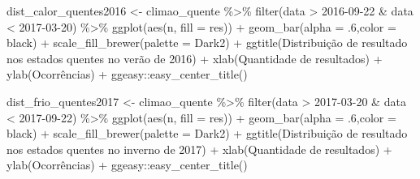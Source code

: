 \documentclass[
]{article}
\newenvironment{Shaded}{\begin{snugshade}}{\end{snugshade}}
\newcommand{\AttributeTok}[1]{\textcolor[rgb]{0.77,0.63,0.00}{#1}}
\newcommand{\DecValTok}[1]{\textcolor[rgb]{0.00,0.00,0.81}{#1}}
\newcommand{\FunctionTok}[1]{\textcolor[rgb]{0.00,0.00,0.00}{#1}}
\newcommand{\NormalTok}[1]{#1}
\newcommand{\OtherTok}[1]{\textcolor[rgb]{0.56,0.35,0.01}{#1}}
\newcommand{\SpecialCharTok}[1]{\textcolor[rgb]{0.00,0.00,0.00}{#1}}
\newcommand{\StringTok}[1]{\textcolor[rgb]{0.31,0.60,0.02}{#1}}
\begin{document}
\begin{Shaded}
\begin{Highlighting}[]
\NormalTok{dist\_calor\_quentes2016 }\OtherTok{\textless{}{-}}\NormalTok{ climao\_quente }\SpecialCharTok{\%\textgreater{}\%} 
  \FunctionTok{filter}\NormalTok{(data }\SpecialCharTok{\textgreater{}} \StringTok{\textquotesingle{}2016{-}09{-}22\textquotesingle{}} \SpecialCharTok{\&}\NormalTok{ data }\SpecialCharTok{\textless{}} \StringTok{\textquotesingle{}2017{-}03{-}20\textquotesingle{}}\NormalTok{) }\SpecialCharTok{\%\textgreater{}\%}
  \FunctionTok{ggplot}\NormalTok{(}\FunctionTok{aes}\NormalTok{(n, }\AttributeTok{fill =}\NormalTok{ res)) }\SpecialCharTok{+} 
  \FunctionTok{geom\_bar}\NormalTok{(}\AttributeTok{alpha =}\NormalTok{ .}\DecValTok{6}\NormalTok{,}\AttributeTok{color =} \StringTok{\textquotesingle{}black\textquotesingle{}}\NormalTok{) }\SpecialCharTok{+} 
  \FunctionTok{scale\_fill\_brewer}\NormalTok{(}\AttributeTok{palette =} \StringTok{\textquotesingle{}Dark2\textquotesingle{}}\NormalTok{) }\SpecialCharTok{+}
  \FunctionTok{ggtitle}\NormalTok{(}\StringTok{\textquotesingle{}Distribuição de resultado nos estados quentes no verão de 2016\textquotesingle{}}\NormalTok{) }\SpecialCharTok{+}
  \FunctionTok{xlab}\NormalTok{(}\StringTok{\textquotesingle{}Quantidade de resultados\textquotesingle{}}\NormalTok{) }\SpecialCharTok{+} \FunctionTok{ylab}\NormalTok{(}\StringTok{\textquotesingle{}Ocorrências\textquotesingle{}}\NormalTok{) }\SpecialCharTok{+}
\NormalTok{  ggeasy}\SpecialCharTok{::}\FunctionTok{easy\_center\_title}\NormalTok{()}


\NormalTok{dist\_frio\_quentes2017 }\OtherTok{\textless{}{-}}\NormalTok{ climao\_quente }\SpecialCharTok{\%\textgreater{}\%} 
  \FunctionTok{filter}\NormalTok{(data }\SpecialCharTok{\textgreater{}} \StringTok{\textquotesingle{}2017{-}03{-}20\textquotesingle{}} \SpecialCharTok{\&}\NormalTok{ data }\SpecialCharTok{\textless{}} \StringTok{\textquotesingle{}2017{-}09{-}22\textquotesingle{}}\NormalTok{) }\SpecialCharTok{\%\textgreater{}\%}
  \FunctionTok{ggplot}\NormalTok{(}\FunctionTok{aes}\NormalTok{(n, }\AttributeTok{fill =}\NormalTok{ res)) }\SpecialCharTok{+} 
  \FunctionTok{geom\_bar}\NormalTok{(}\AttributeTok{alpha =}\NormalTok{ .}\DecValTok{6}\NormalTok{,}\AttributeTok{color =} \StringTok{\textquotesingle{}black\textquotesingle{}}\NormalTok{) }\SpecialCharTok{+} 
  \FunctionTok{scale\_fill\_brewer}\NormalTok{(}\AttributeTok{palette =} \StringTok{\textquotesingle{}Dark2\textquotesingle{}}\NormalTok{) }\SpecialCharTok{+}
  \FunctionTok{ggtitle}\NormalTok{(}\StringTok{\textquotesingle{}Distribuição de resultado nos estados quentes no inverno de 2017\textquotesingle{}}\NormalTok{) }\SpecialCharTok{+}
  \FunctionTok{xlab}\NormalTok{(}\StringTok{\textquotesingle{}Quantidade de resultados\textquotesingle{}}\NormalTok{) }\SpecialCharTok{+} \FunctionTok{ylab}\NormalTok{(}\StringTok{\textquotesingle{}Ocorrências\textquotesingle{}}\NormalTok{) }\SpecialCharTok{+}
\NormalTok{  ggeasy}\SpecialCharTok{::}\FunctionTok{easy\_center\_title}\NormalTok{()}


\end{Highlighting}
\end{Shaded}
\end{document}
